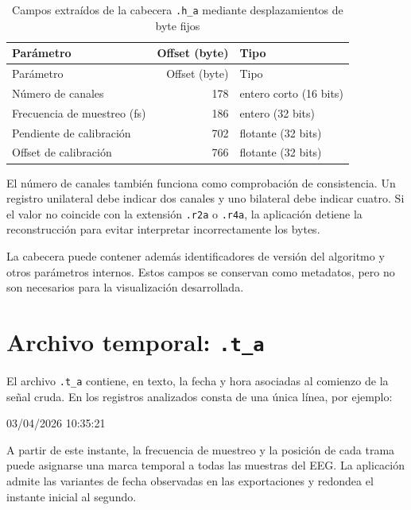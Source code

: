\documentclass[
  spanish,
  a4paper,
  12pt,
  twoside]{memoir}
\newenvironment{Shaded}{\begin{snugshade}}{\end{snugshade}}
\newcommand{\NormalTok}[1]{\textcolor[rgb]{0.00,0.23,0.31}{#1}}
\begin{document}
\begin{longtable}[]{@{}lrl@{}}
\caption{Campos extraídos de la cabecera \protect\texttt{.h\_a} mediante
desplazamientos de byte
fijos}\label{tbl-header-offsets-f}\tabularnewline
\toprule\noalign{}
Parámetro & Offset (byte) & Tipo \\
\midrule\noalign{}
\endfirsthead
\toprule\noalign{}
Parámetro & Offset (byte) & Tipo \\
\midrule\noalign{}
\endhead
\bottomrule\noalign{}
\endlastfoot
Número de canales & 178 & entero corto (16 bits) \\
Frecuencia de muestreo (fs) & 186 & entero (32 bits) \\
Pendiente de calibración & 702 & flotante (32 bits) \\
Offset de calibración & 766 & flotante (32 bits) \\
\end{longtable}

El número de canales también funciona como comprobación de consistencia.
Un registro unilateral debe indicar dos canales y uno bilateral debe
indicar cuatro. Si el valor no coincide con la extensión \texttt{.r2a} o
\texttt{.r4a}, la aplicación detiene la reconstrucción para evitar
interpretar incorrectamente los bytes.

La cabecera puede contener además identificadores de versión del
algoritmo y otros parámetros internos. Estos campos se conservan como
metadatos, pero no son necesarios para la visualización desarrollada.

\chapter{\texorpdfstring{Archivo temporal:
\texttt{.t\_a}}{Archivo temporal: .t\_a}}\label{archivo-temporal-.t_a}

El archivo \texttt{.t\_a} contiene, en texto, la fecha y hora asociadas
al comienzo de la señal cruda. En los registros analizados consta de una
única línea, por ejemplo:

\begin{Shaded}
\begin{Highlighting}[]
\NormalTok{03/04/2026 10:35:21}
\end{Highlighting}
\end{Shaded}

A partir de este instante, la frecuencia de muestreo y la posición de
cada trama puede asignarse una marca temporal a todas las muestras del
EEG. La aplicación admite las variantes de fecha observadas en las
exportaciones y redondea el instante inicial al segundo.
\end{document}
